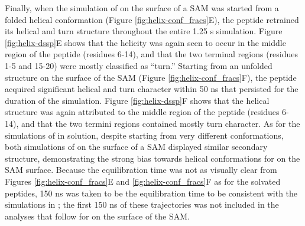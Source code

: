 Finally, when the simulation of \pep{} on the surface of a SAM was started from a folded helical conformation (Figure \ref{fig:helix-conf_fracs}E), the peptide retrained its helical and turn structure throughout the entire 1.25 \textmu{}s simulation. 
Figure \ref{fig:helix-dssp}E shows that the helicity was again seen to occur in the middle region of the peptide (residues 6-14), and that the two terminal regions (residues 1-5 and 15-20) were mostly classified as ``turn.'' 
Starting from an unfolded structure on the surface of the SAM (Figure \ref{fig:helix-conf_fracs}F), the peptide acquired significant helical and turn character within 50 ns that persisted for the duration of the simulation. 
Figure \ref{fig:helix-dssp}F shows that the helical structure was again attributed to the middle region of the peptide (residues 6-14), and that the two termini regions contained mostly turn character. 
As for the simulations of \pep{} in solution, despite starting from very different conformations, both simulations of \pep{} on the surface of a SAM displayed similar secondary structure, demonstrating the strong bias towards helical conformations for \pep{} on the SAM surface. 
Because the equilibration time was not as visually clear from Figures \ref{fig:helix-conf_fracs}E and \ref{fig:helix-conf_fracs}F as for the solvated peptides, 150 ns was taken to be the equilibration time to be consistent with the simulations in \tba{}; 
the first 150 ns of these trajectories was not included in the analyses that follow for \pep{} on the surface of the SAM.

